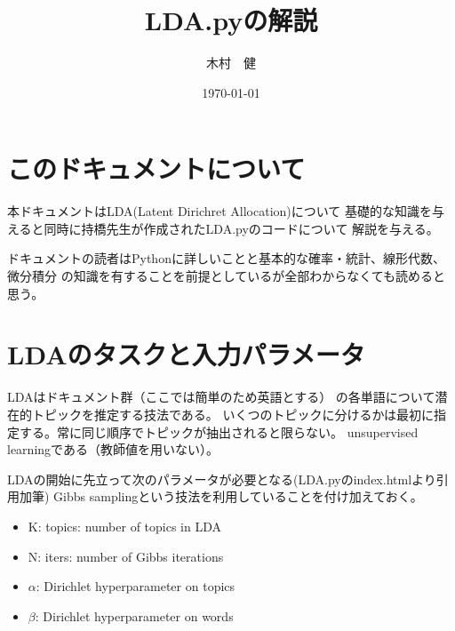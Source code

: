 \documentclass[uplatex]{jsarticle}
\begin{document}
\title{\huge LDA.pyの解説}
\author{木村　健}
\date{\today}
\maketitle







\section{このドキュメントについて}
本ドキュメントはLDA(Latent Dirichret Allocation)について
基礎的な知識を与えると同時に持橋先生が作成されたLDA.pyのコードについて
解説を与える。

ドキュメントの読者はPythonに詳しいことと基本的な確率・統計、線形代数、微分積分
の知識を有することを前提としているが全部わからなくても読めると思う。

\section{LDAのタスクと入力パラメータ}
LDA\cite{blei}はドキュメント群（ここでは簡単のため英語とする）
の各単語について潜在的トピックを推定する技法である。
いくつのトピックに分けるかは最初に指定する。常に同じ順序でトピックが抽出されると限らない。
unsupervised learningである（教師値を用いない）。

LDAの開始に先立って次のパラメータが必要となる(LDA.pyのindex.htmlより引用加筆)
Gibbs samplingという技法を利用していることを付け加えておく。

\begin{itemize}
\item K: topics: number of topics in LDA
\item N: iters: number of Gibbs iterations
\item $\alpha$: Dirichlet hyperparameter on topics
\item $\beta$: Dirichlet hyperparameter on words
\end{itemize}
\end{document}
